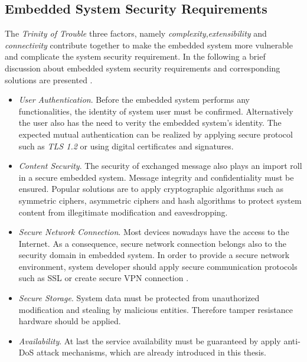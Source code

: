 \subsection{Embedded System Security Requirements} \label{5}
The \emph{Trinity of Trouble} \cite{embedded_secure} three factors, namely \emph{complexity},\emph{extensibility} and \emph{connectivity} contribute together to make the embedded system more vulnerable and complicate the system security requirement.
In the following a brief discussion about embedded system security requirements and corresponding solutions are presented \cite{embedded_secure}.
\begin{itemize}
\item \emph{User Authentication}. Before the embedded system performs any functionalities, the identity of system user must be confirmed. Alternatively the user also has the need to verity the embedded system's identity. The expected mutual authentication can be realized by applying secure protocol such as \emph{TLS 1.2} or using digital certificates and signatures.
\item \emph{Content Security}. The security of exchanged message also plays an import roll in a secure embedded system. Message integrity and confidentiality must be ensured. Popular solutions are to apply cryptographic algorithms such as symmetric ciphers, asymmetric ciphers and hash algorithms to protect system content from illegitimate modification and eavesdropping.
\item \emph{Secure Network Connection}. Most devices nowadays have the access to the Internet. As a consequence, secure  network connection belongs also to the security domain in embedded system. In order  to provide a secure network environment, system developer should apply secure communication protocols such as SSL or create secure VPN connection \cite{embedded_secure}.
\item \emph{Secure Storage}. System data must be protected from unauthorized modification and stealing by malicious entities. Therefore tamper resistance hardware should be applied.
\item \emph{Availability}. At last the service availability must be guaranteed by apply anti-DoS attack mechanisms, which are already introduced in this thesis.
\end{itemize}
